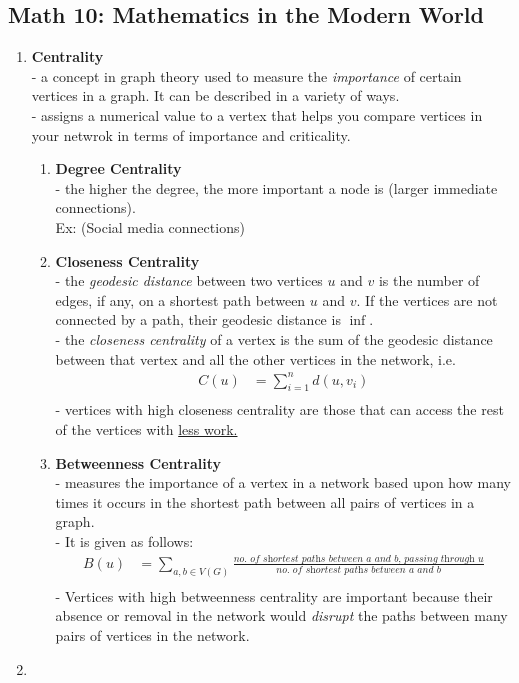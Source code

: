 \documentclass{article}
\begin{document}
\subsection*{Math 10: Mathematics in the Modern World}
\begin{enumerate}
    \item \textbf{Centrality} \\
    - a concept in graph theory used to measure the \textit{importance} of certain vertices in a graph. It can be described in a variety of ways. \\
    - assigns a numerical value to a vertex that helps you compare vertices in your netwrok in terms of importance and criticality. \\
    \begin{enumerate}
        \item \textbf{Degree Centrality} \\
        - the higher the degree, the more important a node is (larger immediate connections). \\
        Ex: (Social media connections) \\
        \item \textbf{Closeness Centrality} \\
        - the \textit{geodesic distance} between two vertices $u$ and $v$ is the number of edges, if any, on a shortest path between $u$ and $v$. If the vertices are not connected by a path, their geodesic distance is $\inf$. \\
        - the \textit{closeness centrality} of a vertex is the sum of the geodesic distance between that vertex and all the other vertices in the network, i.e. \\
        \begin{align*} 
            C(u)&=\sum_{i=1}^n d(u,v_i) \\
        \end{align*}
        - vertices with high closeness centrality are those that can access the rest of the vertices with \underline{less work.}
        \item \textbf{Betweenness Centrality} \\
        - measures the importance of a vertex in a network based upon how many times it occurs in the shortest path between all pairs of vertices in a graph. \\
        - It is given as follows:
        \begin{align*} 
            B(u)&=\sum_{a,b\in V(G)} \frac{\textit{no. of shortest paths between $a$ and $b$, passing through $u$}}{\textit{no. of shortest paths between $a$ and $b$}} \\
        \end{align*}
        - Vertices with high betweenness centrality are important because their absence or removal in the network would \textit{disrupt} the paths between many pairs of vertices in the network. \\
    \end{enumerate}
    \item 
\end{enumerate}
\end{document}
